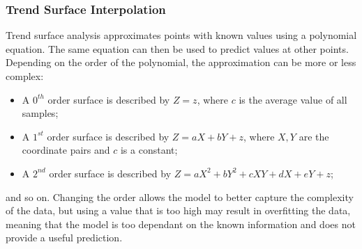 \subsubsection{Trend Surface Interpolation}

Trend surface analysis approximates points with known values using a polynomial equation. The same equation can then be used to predict values at other points. Depending on the order of the polynomial, the approximation can be more or less complex:
\begin{itemize}
    \item A $0^{th}$ order surface is described by $Z = z$, where $c$ is the average value of all samples;
    \item A $1^{st}$ order surface is described by $Z = aX + bY + z$, where $X, Y$ are the coordinate pairs and $c$ is a constant;
    \item A $2^{nd}$ order surface is described by $Z = aX^2 + bY^2 + cXY + dX + eY + z$;
\end{itemize}
and so on. Changing the order allows the model to better capture the complexity of the data, but using a value that is too high may result in overfitting the data, meaning that the model is too dependant on the known information and does not provide a useful prediction.
